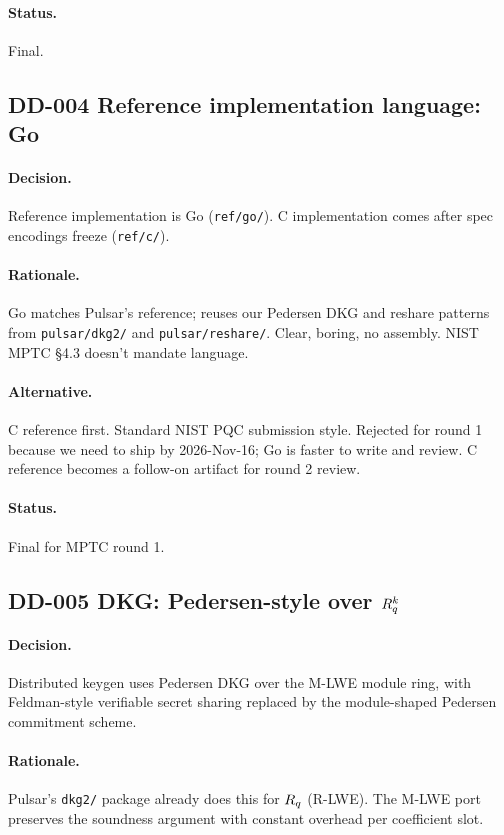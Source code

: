 \paragraph{Status.}
Final.

\subsection{DD-004 Reference implementation language: Go}

\paragraph{Decision.}
Reference implementation is Go (\texttt{ref/go/}). C implementation
comes after spec encodings freeze (\texttt{ref/c/}).

\paragraph{Rationale.}
Go matches Pulsar's reference; reuses our Pedersen DKG and reshare
patterns from \texttt{pulsar/dkg2/} and \texttt{pulsar/reshare/}.
Clear, boring, no assembly. NIST MPTC \S4.3 doesn't mandate
language.

\paragraph{Alternative.}
C reference first. Standard NIST PQC submission style. Rejected for
round 1 because we need to ship by 2026-Nov-16; Go is faster to
write and review. C reference becomes a follow-on artifact for round
2 review.

\paragraph{Status.}
Final for MPTC round 1.

\subsection{DD-005 DKG: Pedersen-style over $R_q^k$}

\paragraph{Decision.}
Distributed keygen uses Pedersen DKG over the M-LWE module ring,
with Feldman-style verifiable secret sharing replaced by the
module-shaped Pedersen commitment scheme.

\paragraph{Rationale.}
Pulsar's \texttt{dkg2/} package already does this for $R_q$ (R-LWE).
The M-LWE port preserves the soundness argument with constant
overhead per coefficient slot.

